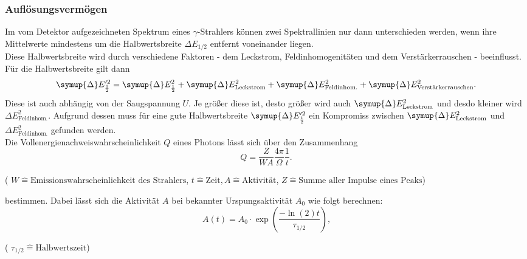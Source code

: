 \subsubsection{Auflösungsvermögen}
Im vom Detektor aufgezeichneten Spektrum eines $\gamma$-Strahlers können zwei Spektrallinien
nur dann unterschieden werden, wenn ihre Mittelwerte mindestens um die Halbwertsbreite
$\Delta E_{1/2}$ entfernt voneinander liegen. \\
Diese Halbwertsbreite wird durch verschiedene Faktoren - dem Leckstrom, Feldinhomogenitäten und dem Verstärkerrauschen - beeinflusst. Für die Halbwertsbreite gilt dann
\begin{equation}
    \symup{\Delta}E'^2_{\frac{1}{2}} = \symup{\Delta}E^2_{\frac{1}{2}} + \symup{\Delta}E^2_\text{Leckstrom} + \symup{\Delta}E^2_\text{Feldinhom.} + \symup{\Delta}E^2_\text{Verstärkerrauschen}.
\end{equation}
Diese ist auch abhängig von der Saugspannung $U$. Je größer diese ist, desto größer wird auch $\symup{\Delta}E^2_\text{Leckstrom}$ und desdo kleiner wird ${\Delta}E^2_\text{Feldinhom.}$. Aufgrund dessen muss für eine gute Halbwertsbreite $\symup{\Delta}E'^2_{\frac{1}{2}}$ ein Kompromiss zwischen $\symup{\Delta}E^2_\text{Leckstrom}$ und ${\Delta}E^2_\text{Feldinhom.}$ gefunden werden. \\
Die Vollenergienachweiswahrscheinlichkeit $Q$ eines Photons lässt sich über den Zusammenhang
\begin{equation}
Q=\frac{Z}{W A}\frac{4\pi}{\Omega}\frac{1}{t}\text{.}\label{eqn:efficency}
\end{equation}
\begin{center}
    \tiny{( $W \hat{=} \text{Emissionswahrscheinlichkeit des Strahlers} $, $t \hat{=} \text{Zeit}, A \hat{=} \text{Aktivität} $, $Z \hat{=} \text{Summe aller Impulse eines Peaks}$)}
\end{center}
bestimmen.
Dabei lässt sich die Aktivität $A$ bei bekannter Urspungsaktivität $A_0$ wie folgt berechnen:
\begin{equation}
A(t) = A_0\cdot \exp\left(\frac{-\ln(2)t}{\tau_{1/2}}\right)\text{,}\label{eqn:A}
\end{equation}
\begin{center}
    \tiny{( $\tau_{1/2} \hat{=} \text{Halbwertszeit}  $)}
\end{center}
